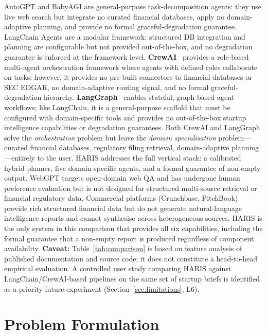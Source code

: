 \documentclass[preprint,12pt]{elsarticle}
\begin{document}
AutoGPT and BabyAGI are general-purpose task-decomposition agents: they use live
web search but integrate no curated financial databases, apply no domain-adaptive
planning, and provide no formal graceful-degradation guarantee. LangChain Agents
are a modular framework: structured DB integration and planning are configurable
but not provided out-of-the-box, and no degradation guarantee is enforced at the
framework level. \textbf{CrewAI}~\cite{crewai2024} provides a role-based
multi-agent orchestration framework where agents with defined roles collaborate on
tasks; however, it provides no pre-built connectors to financial databases or SEC
EDGAR, no domain-adaptive routing signal, and no formal graceful-degradation
hierarchy. \textbf{LangGraph}~\cite{langgraph2024} enables stateful, graph-based
agent workflows; like LangChain, it is a general-purpose scaffold that must be
configured with domain-specific tools and provides no out-of-the-box startup
intelligence capabilities or degradation guarantees. Both CrewAI and LangGraph
solve the \emph{orchestration} problem but leave the \emph{domain specialisation}
problem---curated financial databases, regulatory filing retrieval, domain-adaptive
planning---entirely to the user. HARIS addresses the full vertical stack: a
calibrated hybrid planner, five domain-specific agents, and a formal guarantee of
non-empty output. WebGPT targets open-domain web QA and has undergone human
preference evaluation but is not designed for structured multi-source retrieval or
financial regulatory data. Commercial platforms (Crunchbase, PitchBook) provide
rich structured financial data but do not generate natural-language intelligence
reports and cannot synthesise across heterogeneous sources. HARIS is the only
system in this comparison that provides all six capabilities, including the
formal guarantee that a non-empty report is produced regardless of component
availability. \textbf{Caveat:} Table~\ref{tab:comparison} is based on feature
analysis of published documentation and source code; it does not constitute a
head-to-head empirical evaluation. A controlled user study comparing HARIS
against LangChain/CrewAI-based pipelines on the same set of startup briefs is
identified as a priority future experiment (Section~\ref{sec:limitations}, L6).

\section{Problem Formulation}
\label{sec:problem}
\end{document}
